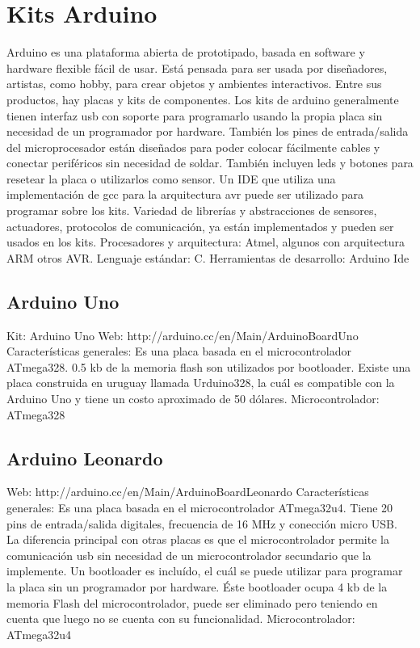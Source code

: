 

\section{Kits Arduino}

Arduino es una plataforma abierta de prototipado, basada en software y hardware flexible fácil de usar. Está pensada para ser usada por diseñadores, artistas, como hobby, para crear objetos y ambientes interactivos. Entre sus productos, hay placas y kits de componentes.
Los kits de arduino generalmente tienen interfaz usb con soporte para programarlo usando la propia placa sin necesidad de un programador por hardware. También los pines de entrada/salida del microprocesador están diseñados para poder colocar fácilmente cables y conectar periféricos sin necesidad de soldar. 
También incluyen leds y botones para resetear la placa o utilizarlos como sensor.
Un IDE que utiliza una implementación de gcc para la arquitectura avr puede ser utilizado para programar sobre los kits. Variedad de librerías y abstracciones de sensores, actuadores, protocolos de comunicación, ya están implementados y pueden ser usados en los kits.
Procesadores y arquitectura: Atmel, algunos con arquitectura ARM otros AVR.
Lenguaje estándar: C.
Herramientas de desarrollo: Arduino Ide

\subsection{Arduino Uno}

Kit:
Arduino Uno
Web:
http://arduino.cc/en/Main/ArduinoBoardUno
Características generales:
Es una placa basada en el microcontrolador ATmega328. 
0.5 kb de la memoria flash son utilizados por bootloader.
Existe una placa construida en uruguay llamada Urduino328, la cuál es compatible con la Arduino Uno y tiene un costo aproximado de 50 dólares.
Microcontrolador:
ATmega328


\subsection{Arduino Leonardo}
Web:
http://arduino.cc/en/Main/ArduinoBoardLeonardo
Características generales:
Es una placa basada en el microcontrolador ATmega32u4. Tiene 20 pins de entrada/salida digitales, frecuencia de 16 MHz y conección micro USB. 
La diferencia principal con otras placas es que el microcontrolador permite la comunicación usb sin necesidad de un microcontrolador secundario que la implemente.
Un bootloader es incluído, el cuál se puede utilizar para programar la placa sin un programador por hardware. Éste bootloader ocupa 4 kb de la memoria Flash del microcontrolador, puede ser eliminado pero teniendo en cuenta que luego no se cuenta con su funcionalidad.
Microcontrolador:
ATmega32u4


